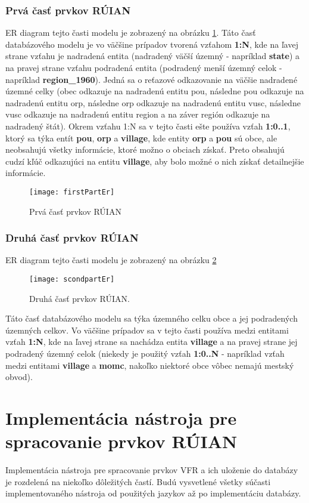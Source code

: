 \subsection{Prvá časť prvkov RÚIAN}
ER diagram tejto časti modelu je zobrazený na obrázku \ref{firstpartEr}. Táto časť databázového modelu je vo väčšine prípadov tvorená vzťahom {\bf 1:N}, kde na ľavej strane vzťahu je nadradená entita (nadradený väčší územný - napríklad {\bf state}) a na pravej strane vzťahu podradená entita (podradený menší územný celok - napríklad {\bf region\_1960}). Jedná sa o reťazové odkazovanie na väčšie nadradené územné celky  (obec  odkazuje na nadradenú entitu pou, následne pou odkazuje na nadradenú entitu orp, následne orp odkazuje na nadradenú entitu vusc, následne vusc odkazuje na nadradenú entitu region a na záver región odkazuje na nadradený štát). Okrem vzťahu 1:N sa v tejto časti ešte používa vzťah {\bf 1:0..1}, ktorý sa týka entít {\bf pou}, {\bf orp} a {\bf village}, kde entity {\bf orp} a {\bf pou} sú obce, ale neobsahujú všetky informácie, ktoré možno o obciach získať. Preto obsahujú cudzí kľúč odkazujúci na entitu {\bf village}, aby bolo možné o nich získať detailnejšie informácie.
\begin{figure}[H]
\texttt{[image: firstPartEr]}
\centering
\caption{Prvá časť prvkov RÚIAN}
\label{firstpartEr}
\end{figure}
\subsection{Druhá časť prvkov RÚIAN}
ER diagram tejto časti modelu je zobrazený na obrázku \ref{secondpartEr}
\begin{figure}[H]
\texttt{[image: scondpartEr]}
\centering
\caption{Druhá časť prvkov RÚIAN.}
\label{secondpartEr}
\end{figure}
Táto časť databázového modelu sa týka územného celku obce a jej podradených územných celkov. Vo väčšine prípadov sa v tejto časti používa medzi entitami vzťah {\bf 1:N}, kde na ľavej strane sa nachádza entita {\bf village} a na pravej strane jej podradený územný celok (niekedy je použitý vzťah {\bf 1:0..N} - napríklad vzťah medzi entitami {\bf village} a {\bf momc}, nakoľko niektoré obce vôbec nemajú mestský obvod).
\chapter {Implementácia nástroja pre spracovanie prvkov RÚIAN}
\label{chapter3}
Implementácia nástroja pre spracovanie prvkov VFR a ich uloženie do databázy je rozdelená na niekoľko dôležitých častí. Budú vysvetlené všetky súčasti implementovaného nástroja od použitých jazykov až po implementáciu databázy.
